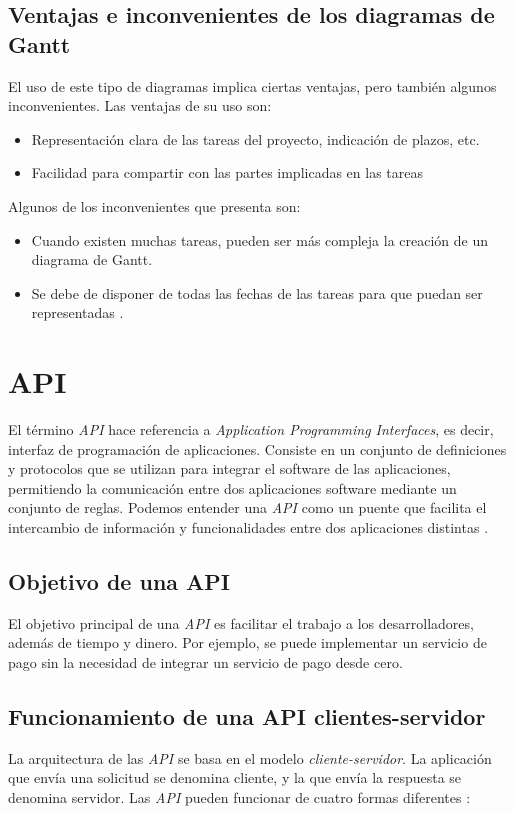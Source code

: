 \subsection{Ventajas e inconvenientes de los diagramas de Gantt}

El uso de este tipo de diagramas implica ciertas ventajas, pero también algunos inconvenientes. Las ventajas de su uso son:
\begin{itemize}
    \item Representación clara de las tareas del proyecto, indicación de plazos, etc.
    \item Facilidad para compartir con las partes implicadas en las tareas
\end{itemize}

Algunos de los inconvenientes que presenta son:
\begin{itemize}
    \item Cuando existen muchas tareas, pueden ser más compleja la creación de un diagrama de Gantt.
    \item Se debe de disponer de todas las fechas de las tareas para que puedan ser representadas \cite{gantt_canva}.
\end{itemize}


\section{API}
El término \textit{API} hace referencia a \textit{Application Programming Interfaces}, es decir, interfaz de programación de aplicaciones. Consiste en un conjunto de definiciones y protocolos que se utilizan para integrar el software de las aplicaciones, permitiendo la comunicación entre dos aplicaciones software mediante un conjunto de reglas. Podemos entender una \textit{API} como un puente que facilita el intercambio de información y funcionalidades entre dos aplicaciones distintas \cite{api_xataka}.

\subsection{Objetivo de una API}
El objetivo principal de una \textit{API} es facilitar el trabajo a los desarrolladores, además de tiempo y dinero. Por ejemplo, se puede implementar un servicio de pago sin la necesidad de integrar un servicio de pago desde cero.

\subsection{Funcionamiento de una API clientes-servidor}
La arquitectura de las \textit{API} se basa en el modelo \textit{cliente-servidor}. La aplicación que envía una solicitud se denomina cliente, y la que envía la respuesta se denomina servidor. Las \textit{API} pueden funcionar de cuatro formas diferentes \cite{api_amazon}:

